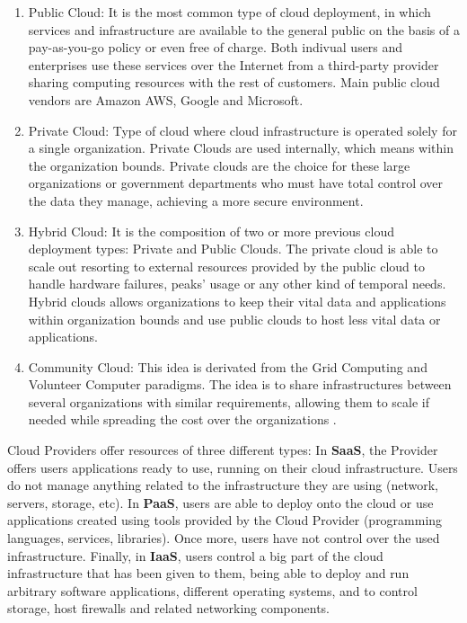 \begin{enumerate}
\item Public Cloud: 
It is the most common type of cloud deployment, in which services and infrastructure are available to the general public on the basis of a pay-as-you-go policy or even free of charge. Both indivual users and enterprises use these services over the Internet from a third-party provider sharing computing resources with the rest of customers. Main public cloud vendors are Amazon AWS, Google and Microsoft.

\item Private Cloud:
Type of cloud where cloud infrastructure is operated solely for a single organization. Private Clouds are used internally, which means within the organization bounds. Private clouds are the choice for these large organizations or government departments who must have total control over the data they manage, achieving a more secure environment. 

\item Hybrid Cloud:
It is the composition of two or more previous cloud deployment types: Private and Public Clouds. The private cloud is able to scale out resorting to external resources provided by the public cloud to handle hardware failures, peaks' usage or any other kind of temporal needs. Hybrid clouds allows organizations to keep their vital data and applications within organization bounds and use public clouds to host less vital data or applications.

\item Community Cloud:
This idea is derivated from the Grid Computing and Volunteer Computer paradigms. The idea is to share infrastructures between several organizations with similar requirements, allowing them to scale if needed while spreading the cost over the organizations \cite{wiki:cloud}.
\end{enumerate}


Cloud Providers offer resources of three different types: In \textbf{SaaS}, the Provider offers users applications ready to use, running on their cloud infrastructure. Users do not manage anything related to the infrastructure they are using (network, servers, storage, etc). In \textbf{PaaS}, users are able to deploy onto the cloud or use applications created using tools provided by the Cloud Provider (programming languages, services, libraries). Once more, users have not control over the used infrastructure. Finally, in \textbf{IaaS}, users control a big part of the cloud infrastructure that has been given to them, being able to deploy and run arbitrary software applications, different operating systems, and to control storage, host firewalls and related networking components.



